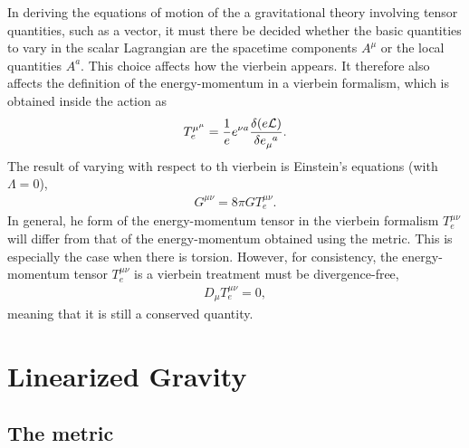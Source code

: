 \documentclass{book}
\numberwithin{equation}{section}
\theoremstyle{definition}
\newcommand{\lag}{\mathcal{L}}
\newcommand{\f}[2]{\frac{#1}{#2}}
\begin{document}
In deriving the equations of motion of the a gravitational theory involving tensor quantities, such as a vector, it must there be decided whether the basic quantities to vary in the scalar Lagrangian are the spacetime components $A^\mu$ or the local quantities $A^a$. This choice affects how the vierbein appears. It therefore also affects the definition of the energy-momentum in a vierbein formalism, which is obtained inside the action as
\begin{align}
T^{\mu^\mu}_e = \f{1}{e} e^{\nu a} \f{\delta(e\lag)}{\delta\tensor{e}{_\mu^a}}.
\end{align}
The result of varying with respect to th vierbein is Einstein's equations (with $\Lambda = 0$),
\begin{align}
G^{\mu\nu} = 8\pi GT^{\mu\nu}_e.
\end{align}
In general, he form of the energy-momentum tensor in the vierbein formalism $T^{\mu\nu}_e$ will differ from that of the energy-momentum obtained using the metric. This is especially the case when there is torsion. However, for consistency, the energy-momentum tensor $T^{\mu\nu}_e$ is a vierbein treatment must be divergence-free,
\begin{align}
D_\mu T^{\mu\nu}_e = 0,
\end{align} 
meaning that it is still a conserved quantity. 


























\newpage








\chapter{Linearized Gravity}

\section{The metric}
\end{document}
